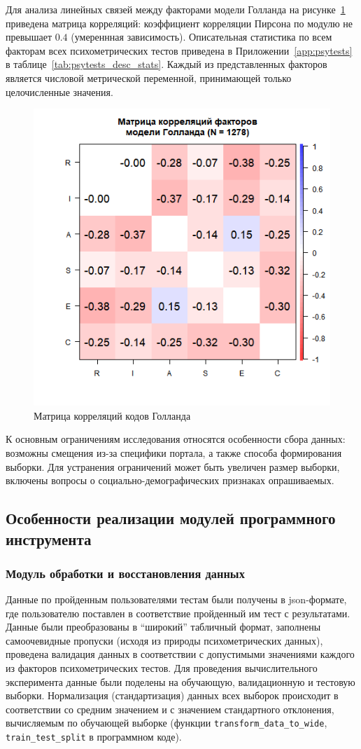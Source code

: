 Для анализа линейных связей между факторами модели Голланда на рисунке~\ref{fig:HL_cor} приведена матрица корреляций: коэффициент корреляции Пирсона по модулю не превышает $0.4$ (умереннная зависимость). Описательная статистика по всем факторам всех психометрических тестов приведена в Приложении~\ref{app:psytests} в таблице~\ref{tab:psytests_desc_stats}. Каждый из представленных факторов является числовой метрической переменной, принимающей только целочисленные значения.

\begin{figure}[bhtp]
    \centering
    \includegraphics[width=0.6\linewidth]{figures/cor_united.png}
    \caption{Матрица корреляций кодов Голланда}
    \label{fig:HL_cor}
\end{figure}

К основным ограничениям исследования относятся особенности сбора данных: возможны смещения из-за специфики портала, а также способа формирования выборки. Для устранения ограничений может быть увеличен размер выборки, включены вопросы о социально-демографических признаках опрашиваемых.


\subsection{Особенности реализации модулей программного инструмента}

\subsubsection{Модуль обработки и восстановления данных}

Данные по пройденным пользователями тестам были получены в json-формате, где пользователю поставлен в соответствие пройденный им тест с результатами. Данные были преобразованы в \enquote{широкий} табличный формат, заполнены самоочевидные пропуски (исходя из природы психометрических данных), проведена валидация данных в соответствии с допустимыми значениями каждого из факторов психометрических тестов. Для проведения вычислительного эксперимента данные были поделены на обучающую, валидационную и тестовую выборки. Нормализация (стандартизация) данных всех выборок происходит в соответствии со средним значением и с значением стандартного отклонения, вычисляемым по обучающей выборке (функции \lstinline{transform_data_to_wide}, \lstinline{train_test_split} в программном коде).

